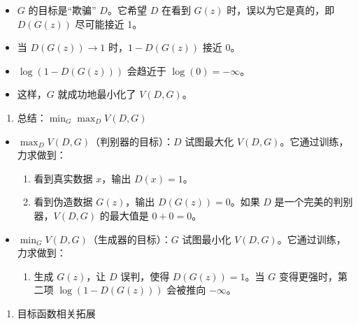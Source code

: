 \begin{itemize}
\begin{itemize}
    \begin{itemize}
    \tightlist
    \item
      \(G\) 的目标是``欺骗'' \(D\)。它希望 \(D\) 在看到 \(G(z)\) 时，误以为它是真的，即 \(D(G(z))\) 尽可能接近 1。
    \item
      当 \(D(G(z))\to 1\) 时，\(1-D(G(z))\) 接近 0。
    \item
      \(\log(1-D(G(z)))\) 会趋近于 \(\log(0)=-\infty\)。
    \item
      这样，\(G\) 就成功地最小化了 \(V(D,G)\)。
    \end{itemize}
  \end{itemize}
\end{itemize}

\begin{enumerate}
\def\labelenumi{\arabic{enumi}.}
\setcounter{enumi}{3}
\tightlist
\item
  总结：\(\min_G \max_D V(D,G)\)
\end{enumerate}

\begin{itemize}
\tightlist
\item
{}
  \(\max_D V(D,G)\)（判别器的目标）：\(D\) 试图最大化 \(V(D,G)\)。它通过训练，力求做到：

  \begin{enumerate}
  \def\labelenumi{\arabic{enumi}.}
  \tightlist
  \item
    看到真实数据 \(x\)，输出 \(D(x)=1\)。
  \item
    看到伪造数据 \(G(z)\)，输出 \(D(G(z))=0\)。如果 \(D\) 是一个完美的判别器，\(V(D,G)\) 的最大值是 \(0+0=0\)。
  \end{enumerate}
\item
{}
  \(\min_G V(D,G)\)（生成器的目标）：\(G\) 试图最小化 \(V(D,G)\)。它通过训练，力求做到：

  \begin{enumerate}
  \def\labelenumi{\arabic{enumi}.}
  \tightlist
  \item
    生成 \(G(z)\)，让 \(D\) 误判，使得 \(D(G(z))=1\)。当 \(G\) 变得更强时，第二项 \(\log(1-D(G(z)))\) 会被推向 \(-\infty\)。
  \end{enumerate}
\end{itemize}

\begin{enumerate}
\def\labelenumi{\arabic{enumi}.}
\setcounter{enumi}{4}
\tightlist
\item
  目标函数相关拓展
\end{enumerate}

